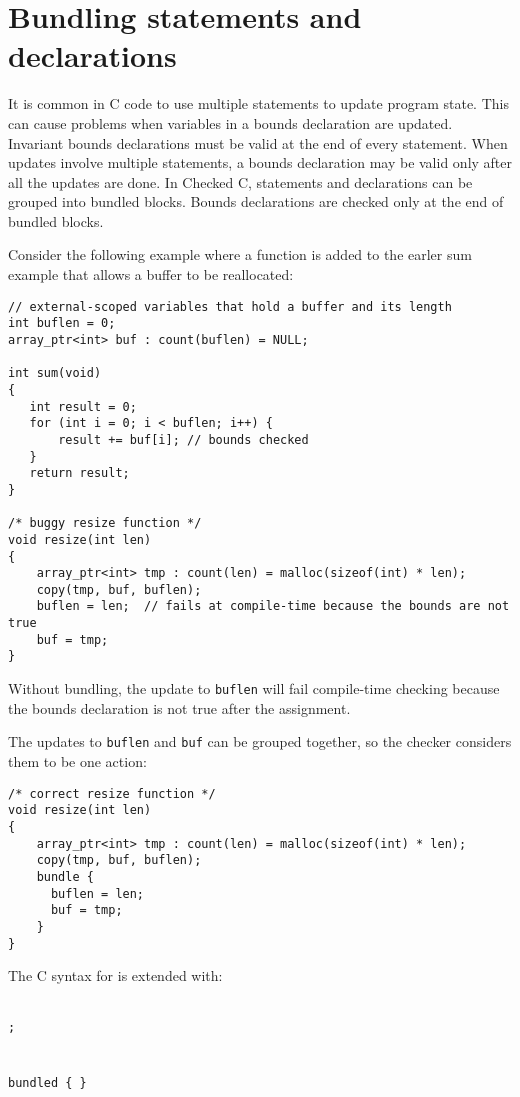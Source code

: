 \section{Bundling statements and declarations}

It is common in C code to use multiple statements to update program state.
This can cause problems when variables in a bounds declaration are updated.
Invariant bounds declarations must be valid at the end of every statement.
When updates involve multiple statements, a bounds declaration may be valid only
after all the updates are done.  In Checked C, statements and declarations can be 
grouped into bundled blocks.  Bounds declarations are checked only at the end of bundled blocks.

Consider the following example where a function is added to the earler sum
example that allows a buffer to be reallocated:
\begin{verbatim}
// external-scoped variables that hold a buffer and its length
int buflen = 0;
array_ptr<int> buf : count(buflen) = NULL;

int sum(void)
{
   int result = 0;
   for (int i = 0; i < buflen; i++) {
       result += buf[i]; // bounds checked
   }
   return result;
}

/* buggy resize function */
void resize(int len) 
{
    array_ptr<int> tmp : count(len) = malloc(sizeof(int) * len);
    copy(tmp, buf, buflen);
    buflen = len;  // fails at compile-time because the bounds are not true
    buf = tmp;
}
\end{verbatim}
Without bundling, the update to \texttt{buflen} will fail
compile-time checking because the bounds declaration is not true after the
assignment.

The updates to \texttt{buflen} and \texttt{buf} can be grouped together,
so the checker considers them to be one action:
\begin{verbatim}
/* correct resize function */
void resize(int len) 
{
    array_ptr<int> tmp : count(len) = malloc(sizeof(int) * len);
    copy(tmp, buf, buflen);
    bundle {
      buflen = len;
      buf = tmp;
    }
}
\end{verbatim}

The C syntax for is extended with:
\begin{tabbing}
\=\\
\>\texttt{;} \\
\\
 \\
\>\texttt{bundled \{  \}} \\
\\
\\
\>  \\
\>  \\
\\
\\
\> \\
\>  
\end{tabbing}

